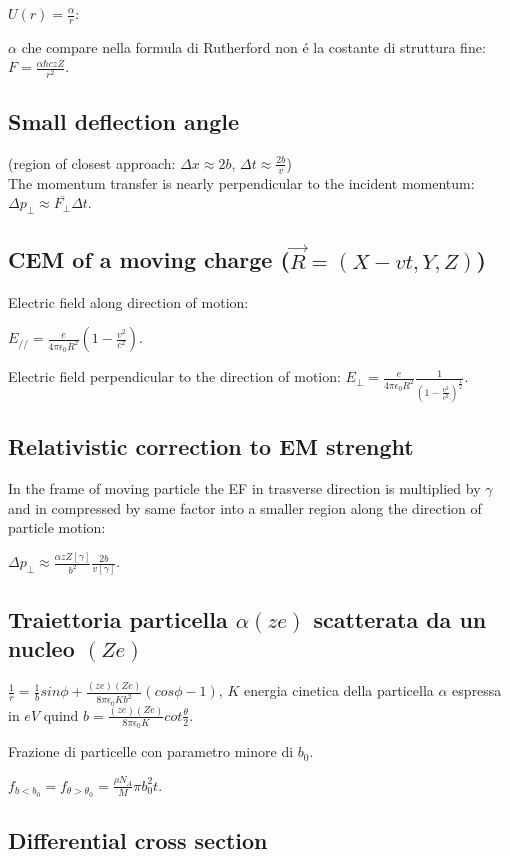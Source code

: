 \documentclass[main.tex]{subfiles}
\begin{document}
$U(r)=\frac{\alpha}{r}$:

$\alpha$ che compare nella formula di Rutherford non \'e la costante di struttura fine:
$F=\frac{\alpha \hbar c zZ}{r^2}$.

\subsection{Small deflection angle}
(region of closest approach: $\Delta x\approx 2b$, $\Delta t\approx\frac{2b}{v}$)\\
The momentum transfer is nearly perpendicular to the incident momentum: $\Delta p_{\perp}\approx \overline{F_{\perp}}\Delta t$.

\subsection{CEM of a moving charge ($\vec{R}=(X-vt,Y,Z)$)}
Electric field along direction of motion:

$E_{//}=\frac{e}{4\pi\epsilon_0R^2}(1-\frac{v^2}{c^2})$.

Electric field perpendicular to the direction of motion: $E_{\perp}=\frac{e}{4\pi\epsilon_0R^2}\frac{1}{(1-\frac{v^2}{c^2})^{\frac{1}{2}}}$.

\subsection{Relativistic correction to EM strenght}

In the frame of moving particle the EF in trasverse direction is multiplied by $\gamma$ and in compressed by same factor into a smaller region along the direction of particle motion:

$\Delta p_{\perp}\approx\frac{\alpha zZ[\gamma]}{b^2}\frac{2b}{v[\gamma]}$.

\subsection{Traiettoria particella $\alpha (ze)$ scatterata da un nucleo $(Ze)$}
$\frac{1}{r}=\frac{1}{b}sin{\phi}+\frac{(ze)(Ze)}{8 \pi \epsilon_0Kb^2}(cos{\phi}-1)$, $K$ energia cinetica della particella $\alpha$ espressa in $eV$ quind $b=\frac{(ze)(Ze)}{8 \pi \epsilon_0K}cot{\frac{\theta}{2}}$.

 Frazione di particelle con parametro minore di $b_0$.
 
 $f_{b<b_0}=f_{\theta>\theta_0}=\frac{\rho N_A}{M}\pi b_0^2t$.

\subsection{Differential cross section}
\end{document}
